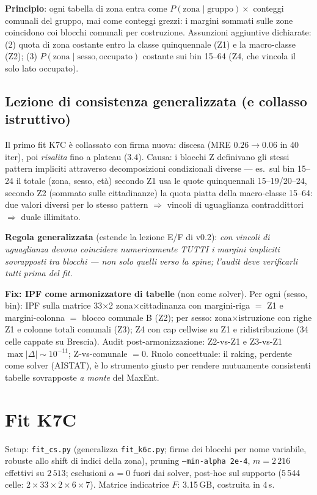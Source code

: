 \documentclass[11pt,a4paper]{article}
\newcommand{\code}[1]{\texttt{#1}}
\begin{document}
\medskip\noindent\textbf{Principio}: ogni tabella di zona entra come
$P(\text{zona}\mid\text{gruppo})\times$ conteggi comunali del gruppo, mai come
conteggi grezzi: i margini sommati sulle zone coincidono coi blocchi comunali
per costruzione. Assunzioni aggiuntive dichiarate: (2) quota di zona costante
entro la classe quinquennale (Z1) e la macro-classe (Z2); (3)
$P(\text{zona}\mid\text{sesso}, \text{occupato})$ costante sui bin 15--64
(Z4, che vincola il solo lato occupato).

\subsection{Lezione di consistenza generalizzata (e collasso istruttivo)}
\label{sec:lesson}
Il primo fit K7C \`e collassato con firma nuova: discesa (MRE
$0.26\to0.06$ in 40 iter), poi \emph{risalita} fino a plateau ($3.4$).
Causa: i blocchi Z definivano gli stessi pattern impliciti attraverso
decomposizioni condizionali diverse --- es.\ sul bin 15--24 il totale
(zona, sesso, et\`a) secondo Z1 usa le quote quinquennali 15--19/20--24,
secondo Z2 (sommato sulle cittadinanze) la quota piatta della macro-classe
15--64: due valori diversi per lo stesso pattern $\Rightarrow$ vincoli di
uguaglianza contraddittori $\Rightarrow$ duale illimitato.

\medskip\noindent\textbf{Regola generalizzata} (estende la lezione E/F di
v0.2): \emph{con vincoli di uguaglianza devono coincidere numericamente
TUTTI i margini impliciti sovrapposti tra blocchi --- non solo quelli verso
la spine; l'audit deve verificarli tutti prima del fit.}

\medskip\noindent\textbf{Fix: IPF come armonizzatore di tabelle} (non come
solver). Per ogni (sesso, bin): IPF sulla matrice 33$\times$2
zona$\times$cittadinanza con margini-riga $=$ Z1 e margini-colonna $=$ blocco
comunale B (Z2); per sesso: zona$\times$istruzione con righe Z1 e colonne
totali comunali (Z3); Z4 con cap cellwise su Z1 e ridistribuzione (34 celle
cappate su Brescia). Audit post-armonizzazione: Z2-vs-Z1 e Z3-vs-Z1
$\max|\Delta| \sim 10^{-11}$; Z-vs-comunale $=0$. Ruolo concettuale: il
raking, perdente come solver (AISTAT), \`e lo strumento giusto per rendere
mutuamente consistenti tabelle sovrapposte \emph{a monte} del MaxEnt.

\section{Fit K7C}
\label{sec:fitk7c}
Setup: \code{fit\_cs.py} (generalizza \code{fit\_k6c.py}; firme dei blocchi
per nome variabile, robuste allo shift di indici della zona), pruning
\code{--min-alpha 2e-4}, $m=2\,216$ effettivi su $2\,513$; esclusioni
$\alpha=0$ fuori dai solver, post-hoc sul supporto (5\,544 celle:
$2\times33\times2\times6\times7$). Matrice indicatrice $F$: 3.15\,GB,
costruita in 4\,s.
\end{document}
